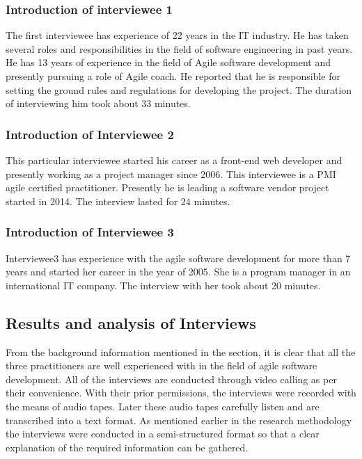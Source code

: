 \documentclass[a4paper,oneside]{bth}
\begin{document}
\subsubsection{Introduction of interviewee 1}
The first interviewee has experience of 22 years in the IT industry. He has taken several roles and responsibilities in the field of software engineering in past years. He has 13 years of experience in the field of Agile software development and presently pursuing a role of Agile coach. He reported that he is responsible for setting the ground rules and regulations for developing the project. The duration of interviewing him took about 33 minutes.
\subsubsection{Introduction of Interviewee 2}
This particular interviewee started his career as a front-end web developer and presently working as a project manager since 2006. This interviewee is a PMI agile certified practitioner. Presently he is leading a software vendor project started in 2014. The interview lasted for 24 minutes.
\subsubsection{Introduction of Interviewee 3}
Interviewee3 has experience with the agile software development for more than 7 years and started her career in the year of 2005. She is a program manager in an international IT company. The interview with her took about 20 minutes.
\subsection{Results and analysis of Interviews}

From the background information mentioned in the section, it is clear that all the three practitioners are well experienced with in the field of agile software development. All of the interviews are conducted through video calling as per their convenience. With their prior permissions, the interviews were recorded with the means of audio tapes. Later these audio tapes carefully listen and are transcribed into a text format. As mentioned earlier in the research methodology the interviews were conducted in a semi-structured format so that a clear explanation of the required information can be gathered.
\end{document}
